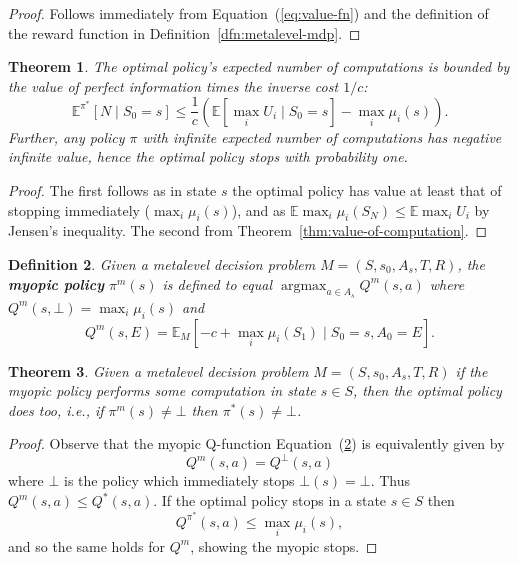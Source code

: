 \documentclass[]{article}
\newcommand {\IE} {\ensuremath {\mathbb{E}}}
\newcommand {\term}[1] {\textbf{#1}}
\newcommand {\given} {\mid} %
\DeclareMathOperator*{\argmax}{argmax}
\newtheorem{thm}{Theorem}
\newtheorem{dfn}[thm]{Definition}
\renewcommand{\eqref}[1]{Equation~(\ref{#1})}
\newcommand{\thmref}[1]{Theorem~\ref{#1}}
\newcommand{\dfnref}[1]{Definition~\ref{#1}}
\begin{document}
	\begin{proof}
		Follows immediately from \eqref{eq:value-fn} and the definition of the
		reward function in \dfnref{dfn:metalevel-mdp}.
	\end{proof}

	\begin{thm}\label{thm:bounded-expected-computations}
		The optimal policy's expected number of computations is bounded by the 
		value of perfect information  times the inverse cost $1/c$:
		\[
			\IE^{\pi^*}[N\given S_0=s] \le \frac{1}{c} \left(\IE[\max_i U_i\given S_0=s] - \max_i \mu_i(s)\right).
		\]
		Further, any policy $\pi$ with infinite expected number of computations 
		has negative infinite value, hence the optimal
		policy stops with probability one.
	\end{thm}

	\begin{proof}
		The first follows as in state $s$ the optimal policy has value at least that
		of stopping immediately ($\max_i \mu_i(s)$), and as $\IE \max_i\mu_i(S_N) \le \IE \max_i U_i$ by Jensen's inequality.
		The second from \thmref{thm:value-of-computation}.
	\end{proof}


	\begin{dfn}\label{dfn:myopic}
		Given a metalevel decision problem $M=(S,s_0,A_s,T,R)$,
		the \term{myopic policy} $\pi^m(s)$ is defined to equal $\argmax_{a\in A_s} Q^m(s,a)$ 
		where $Q^m(s,\bot) = \max_i \mu_i(s)$ and
		\begin{equation*}%
			 Q^m(s,E) = \IE_M[ -c + \max_i \mu_i(S_1) \given S_0 = s, A_0 = E].		
		\end{equation*}
	\end{dfn}


	\begin{thm}\label{thm:optimal-myopic}
		Given a metalevel decision problem $M=(S,s_0,A_s,T,R)$
		if the myopic policy performs some computation in state $s\in S$,
		then the optimal policy does too, i.e., if $\pi^m(s)\neq\bot$ then $\pi^*(s)\neq\bot$.
	\end{thm}

	\begin{hiddenproof}
		\begin{proof}
			Observe that the myopic Q-function \eqref{dfn:myopic} is equivalently given by
			\[
				Q^m(s,a) = Q^\bot(s,a)
			\]
			where $\bot$ is the policy which immediately stops $\bot(s)=\bot$.
			Thus $Q^m(s,a) \le Q^*(s,a)$.  If the optimal policy stops in a state $s\in S$ then
			\[
				Q^{\pi^*}(s,a) \le \max_i \mu_i(s),
			\]
			and so the same holds for $Q^m$, showing the myopic stops.
		\end{proof}
	\end{hiddenproof}
\end{document}

